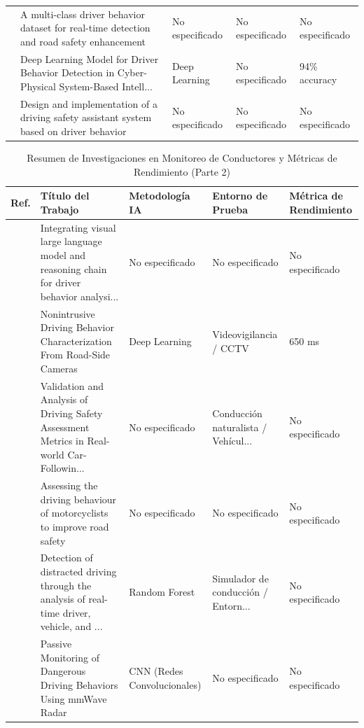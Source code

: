 \begin{table}[htbp]
\begin{tabular}{cp{7.5cm}p{2.8cm}p{2.8cm}p{2.8cm}}
\cite{afridi2025multiclass} & A multi-class driver behavior dataset for real-time detection and road safety enhancement & No especificado & No especificado & No especificado \\
\cite{gupta2024deep} & Deep Learning Model for Driver Behavior Detection in Cyber-Physical System-Based Intell... & Deep Learning & No especificado & 94\% accuracy \\
\cite{salbi2024design} & Design and implementation of a driving safety assistant system based on driver behavior & No especificado & No especificado & No especificado \\
\bottomrule
\end{tabular}
\end{table}


\begin{table}[htbp]
\centering
\renewcommand{\arraystretch}{1.1}
\caption{Resumen de Investigaciones en Monitoreo de Conductores y Métricas de Rendimiento (Parte 2)}
\label{tab:articulos_conductores_2}
\footnotesize
\begin{tabular}{cp{7.5cm}p{2.8cm}p{2.8cm}p{2.8cm}}
\toprule
\textbf{Ref.} & \textbf{Título del Trabajo} & \textbf{Metodología IA} & \textbf{Entorno de Prueba} & \textbf{Métrica de Rendimiento} \\
\midrule
\cite{zhang2024integrating} & Integrating visual large language model and reasoning chain for driver behavior analysi... & No especificado & No especificado & No especificado \\
\cite{kumar2024nonintrusive} & Nonintrusive Driving Behavior Characterization From Road-Side Cameras & Deep Learning & Videovigilancia / CCTV & 650 ms \\
\cite{lu2024validation} & Validation and Analysis of Driving Safety Assessment Metrics in Real-world Car-Followin... & No especificado & Conducción naturalista / Vehícul... & No especificado \\
\cite{charef2024assessing} & Assessing the driving behaviour of motorcyclists to improve road safety & No especificado & No especificado & No especificado \\
\cite{usman2024distracted} & Detection of distracted driving through the analysis of real-time driver, vehicle, and ... & Random Forest & Simulador de conducción / Entorn... & No especificado \\
\cite{sen2024passive} & Passive Monitoring of Dangerous Driving Behaviors Using mmWave Radar & CNN (Redes Convolucionales) & No especificado & No especificado \\

\end{tabular}
\end{table}
